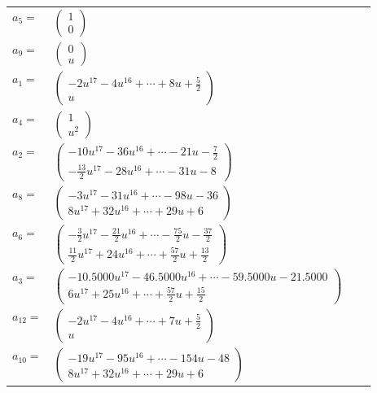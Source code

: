 \documentclass[1p]{elsarticle_modified}
\theoremstyle{definition}
\begin{document}
\begin{tabular}{m{7pt} m{180pt} m{7pt} m{180pt} }
\flushright $a_{5}=$&$\begin{pmatrix}1\\0\end{pmatrix}$ \\
\flushright $a_{9}=$&$\begin{pmatrix}0\\u\end{pmatrix}$ \\
\flushright $a_{1}=$&$\begin{pmatrix}-2 u^{17}-4 u^{16}+\cdots+8 u+\frac{5}{2}\\u\end{pmatrix}$ \\
\flushright $a_{4}=$&$\begin{pmatrix}1\\u^2\end{pmatrix}$ \\
\flushright $a_{2}=$&$\begin{pmatrix}-10 u^{17}-36 u^{16}+\cdots-21 u-\frac{7}{2}\\-\frac{13}{2} u^{17}-28 u^{16}+\cdots-31 u-8\end{pmatrix}$ \\
\flushright $a_{8}=$&$\begin{pmatrix}-3 u^{17}-31 u^{16}+\cdots-98 u-36\\8 u^{17}+32 u^{16}+\cdots+29 u+6\end{pmatrix}$ \\
\flushright $a_{6}=$&$\begin{pmatrix}-\frac{3}{2} u^{17}-\frac{21}{2} u^{16}+\cdots-\frac{75}{2} u-\frac{37}{2}\\\frac{11}{2} u^{17}+24 u^{16}+\cdots+\frac{57}{2} u+\frac{13}{2}\end{pmatrix}$ \\
\flushright $a_{3}=$&$\begin{pmatrix}-10.5000 u^{17}-46.5000 u^{16}+\cdots-59.5000 u-21.5000\\6 u^{17}+25 u^{16}+\cdots+\frac{57}{2} u+\frac{15}{2}\end{pmatrix}$ \\
\flushright $a_{12}=$&$\begin{pmatrix}-2 u^{17}-4 u^{16}+\cdots+7 u+\frac{5}{2}\\u\end{pmatrix}$ \\
\flushright $a_{10}=$&$\begin{pmatrix}-19 u^{17}-95 u^{16}+\cdots-154 u-48\\8 u^{17}+32 u^{16}+\cdots+29 u+6\end{pmatrix}$ \\

\end{tabular}
\end{document}
